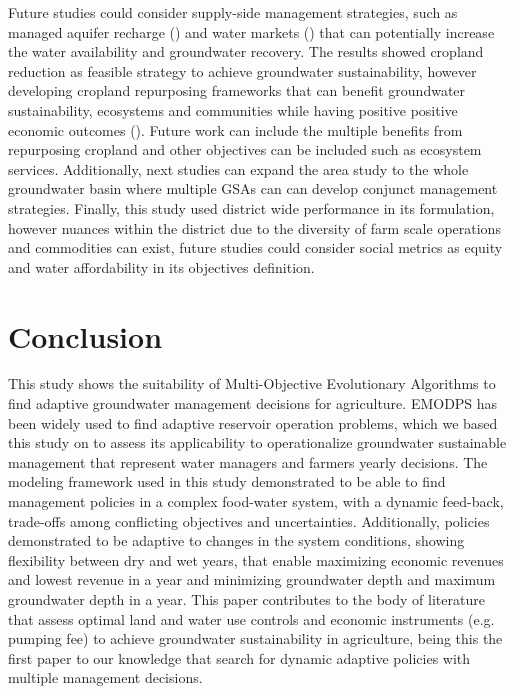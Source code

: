 \documentclass[11pt,a4paper]{article}
\begin{document}
Future studies could consider supply-side management strategies, such as managed aquifer recharge (\cite{alam_can_2020}) and water markets (\cite{arellano-gonzalez_adaptive_2021,hanak_water_2019}) that can potentially increase the water availability and groundwater recovery. The results showed cropland reduction as feasible strategy to achieve groundwater sustainability, however developing cropland repurposing frameworks that can benefit groundwater sustainability, ecosystems and communities while having positive positive economic outcomes (\cite{fernandez-bou_water_2023,biggs_landowner_2022}). Future work can include the multiple benefits from repurposing cropland and other objectives can be included such as ecosystem services. Additionally, next studies can expand the area study to the whole groundwater basin where multiple GSAs can can develop conjunct management strategies. Finally, this study used district wide performance in its formulation, however nuances within the district due to the diversity of farm scale operations and commodities can exist, future studies could consider social metrics as equity and water affordability in its objectives definition.
 

\section{Conclusion}

This study shows the suitability of Multi-Objective Evolutionary Algorithms to find adaptive groundwater management decisions for agriculture. EMODPS has been widely used to find adaptive reservoir operation problems, which we based this study on to assess its applicability to operationalize groundwater sustainable management that represent water managers and farmers yearly decisions. The modeling framework used in this study demonstrated to be able to find management policies in a complex food-water system, with a dynamic feed-back, trade-offs among conflicting objectives and uncertainties. Additionally, policies demonstrated to be adaptive to changes in the system conditions, showing flexibility between dry and wet years, that enable maximizing economic revenues and lowest revenue in a year and minimizing groundwater depth and maximum groundwater depth in a year. This paper contributes to the body of literature that assess optimal land and water use controls and economic instruments (e.g. pumping fee) to achieve groundwater sustainability in agriculture, being this the first paper to our knowledge that search for dynamic adaptive policies with multiple management decisions. 
\end{document}
